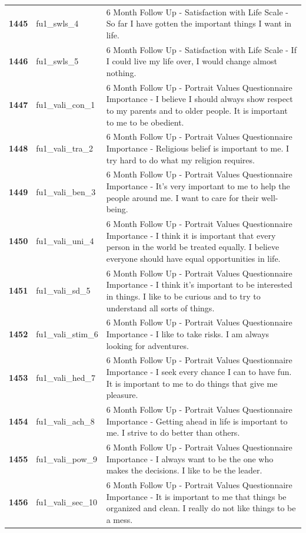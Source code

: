 \documentclass[
  letterpaper,
  DIV=11,
  numbers=noendperiod]{scrartcl}
\begin{document}
\begin{longtable}[t]{>{}cll}
\textbf{1445} & fu1\_swls\_4 & 6 Month Follow Up - Satisfaction with Life Scale - So far I have gotten the important things I want in life.\\
\addlinespace
\textbf{1446} & fu1\_swls\_5 & 6 Month Follow Up - Satisfaction with Life Scale - If I could live my life over, I would change almost nothing.\\
\textbf{1447} & fu1\_vali\_con\_1 & 6 Month Follow Up - Portrait Values Questionnaire Importance - I believe I should always show respect to my parents and to older people. It is important to me to be obedient.\\
\textbf{1448} & fu1\_vali\_tra\_2 & 6 Month Follow Up - Portrait Values Questionnaire Importance - Religious belief is important to me. I try hard to do what my religion requires.\\
\textbf{1449} & fu1\_vali\_ben\_3 & 6 Month Follow Up - Portrait Values Questionnaire Importance - It's very important to me to help the people around me. I want to care for their well-being.\\
\textbf{1450} & fu1\_vali\_uni\_4 & 6 Month Follow Up - Portrait Values Questionnaire Importance - I think it is important that every person in the world be treated equally. I believe everyone should have equal opportunities in life.\\
\addlinespace
\textbf{1451} & fu1\_vali\_sd\_5 & 6 Month Follow Up - Portrait Values Questionnaire Importance - I think it's important to be interested in things. I like to be curious and to try to understand all sorts of things.\\
\textbf{1452} & fu1\_vali\_stim\_6 & 6 Month Follow Up - Portrait Values Questionnaire Importance - I like to take risks. I am always looking for adventures.\\
\textbf{1453} & fu1\_vali\_hed\_7 & 6 Month Follow Up - Portrait Values Questionnaire Importance - I seek every chance I can to have fun. It is important to me to do things that give me pleasure.\\
\textbf{1454} & fu1\_vali\_ach\_8 & 6 Month Follow Up - Portrait Values Questionnaire Importance - Getting ahead in life is important to me. I strive to do better than others.\\
\textbf{1455} & fu1\_vali\_pow\_9 & 6 Month Follow Up - Portrait Values Questionnaire Importance - I always want to be the one who makes the decisions. I like to be the leader.\\
\addlinespace
\textbf{1456} & fu1\_vali\_sec\_10 & 6 Month Follow Up - Portrait Values Questionnaire Importance - It is important to me that things be organized and clean. I really do not like things to be a mess.\\

\end{longtable}
\end{document}

